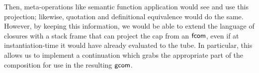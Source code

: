\documentclass{article}
\begin{document}
Then, meta-operations like semantic function application would see and use this
projection; likewise, quotation and definitional equivalence would do the same.
However, by keeping this information, we would be able to extend the language
of closures with a stack frame that can project the cap from an
$\mathsf{fcom}$, even if at instantiation-time it would have already evaluated
to the tube. In particular, this allows us to implement a continuation which
grabs the appropriate part of the composition for use in the resulting
$\mathsf{gcom}$.
\end{document}
